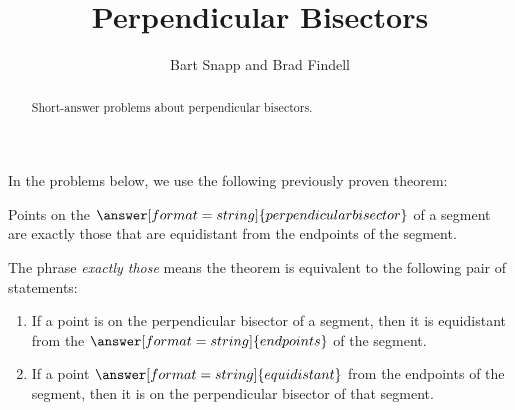\documentclass[nooutcomes]{ximera}
\title{Perpendicular Bisectors}
\author{Bart Snapp and Brad Findell}
\begin{document}
\begin{abstract}
Short-answer problems about perpendicular bisectors. 
\end{abstract}
\maketitle


\begin{problem}
In the problems below, we use the following previously proven theorem: 
\begin{theorem}
Points on the $\answer[format=string]{perpendicular bisector}$ of a segment are exactly those 
that are equidistant from the endpoints of the segment.  
\end{theorem}
\begin{problem}
The phrase \emph{exactly those} means the theorem is equivalent to the following pair of statements: 
\begin{enumerate}
\item If a point is on the perpendicular bisector of a segment, then it is equidistant from the $\answer[format=string]{endpoints}$ of the segment. 
\item If a point $\answer[format=string]{equidistant}$ from the endpoints of the segment, then it is on the perpendicular bisector of that segment. 
\end{enumerate}
\end{problem}
\end{problem}
\end{document}
